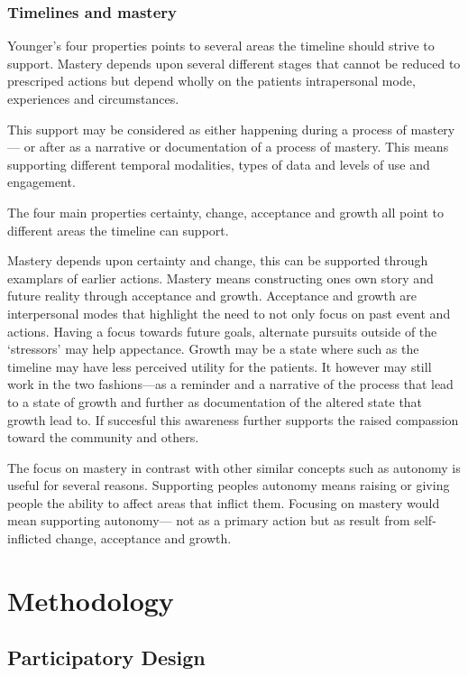 \documentclass[UKenglish]{uiophd}
\begin{document}
		\subsection{Timelines and mastery}

			Younger's four properties points to several areas the timeline should strive to support. Mastery depends upon several different stages that cannot be reduced to prescriped actions but depend wholly on the patients intrapersonal mode, experiences and circumstances.

			This support may be considered as either happening during a process of mastery--- or after as a narrative or documentation of a process of mastery. This means supporting different temporal modalities, types of data and levels of use and engagement.   

			The four main properties certainty, change, acceptance and growth all point to different areas the timeline can support. 

			Mastery depends upon certainty and change, this can be supported through examplars of earlier actions. Mastery means constructing ones own story and future reality through acceptance and growth. Acceptance and growth are interpersonal modes that highlight the need to not only focus on past event and actions. Having a focus towards future goals, alternate pursuits outside of the `stressors' may help appectance. Growth may be a state where such as the timeline may have less perceived utility for the patients. It however may still work in the two fashions---as a reminder and a narrative of the process that lead to a state of growth and further as documentation of the altered state that growth lead to. If succesful this awareness further supports the raised compassion toward the community and others. 

			The focus on mastery in contrast with other similar concepts such as autonomy is useful for several reasons. Supporting peoples autonomy means raising or giving people the ability to affect areas that inflict them. Focusing on mastery would mean supporting autonomy--- not as a primary action but as result from self-inflicted change, acceptance and growth.

\chapter{Methodology}

	\section{Participatory Design}
\end{document}
